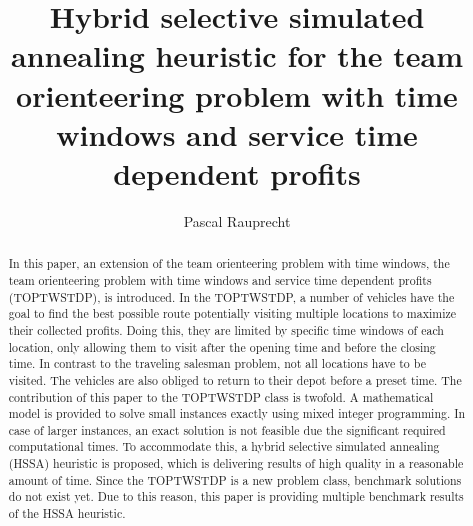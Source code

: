 \documentclass[final,5p,times,twocolumn]{elsarticle}
\begin{document}
\begin{frontmatter}



\title{Hybrid selective simulated annealing heuristic for the team orienteering problem with time windows and service time dependent profits}


\author{Pascal Rauprecht}
\address{European University Viadrina, Frankfurt (Oder), Germany}



\begin{abstract}
In this paper, an extension of the team orienteering problem with time windows, the team orienteering problem with time windows and service time dependent profits (TOPTWSTDP), is introduced. In the TOPTWSTDP, a number of vehicles have the goal to find the best possible route potentially visiting multiple locations to maximize their collected profits. Doing this, they are limited by specific time windows of each location, only allowing them to visit after the opening time and before the closing time. In contrast to the traveling salesman problem, not all locations have to be visited. The vehicles are also obliged to return to their depot before a preset time. The contribution of this paper to the TOPTWSTDP class is twofold. A mathematical model is provided to solve small instances exactly using mixed integer programming. In case of larger instances, an exact solution is not feasible due the significant required computational times. To accommodate this, a hybrid selective simulated annealing (HSSA) heuristic is proposed, which is delivering results of high quality in a reasonable amount of time. Since the TOPTWSTDP is a new problem class, benchmark solutions do not exist yet. Due to this reason, this paper is providing multiple benchmark results of the HSSA heuristic.
\end{abstract}


\end{frontmatter}
\end{document}
